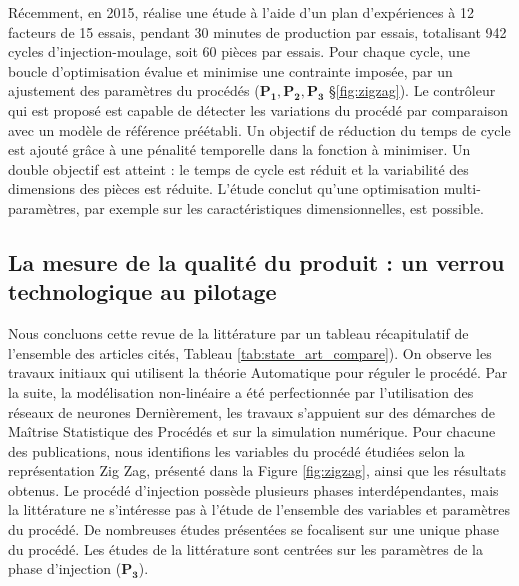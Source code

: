 Récemment, en 2015, \cite{johnston_-line_2015} réalise une étude à l'aide d'un plan d'expériences à 12 facteurs de 15 essais, pendant 30 minutes de production par essais, totalisant 942 cycles d'injection-moulage, soit 60 pièces par essais.
Pour chaque cycle, une boucle d'optimisation évalue et minimise une contrainte imposée, par un ajustement des paramètres du procédés ($\boldsymbol{P_1, P_2, P_3}$ §\ref{fig:zigzag}).
Le contrôleur qui est proposé est capable de détecter les variations du procédé par comparaison avec un modèle de référence préétabli.
Un objectif de réduction du temps de cycle est ajouté grâce à une pénalité temporelle dans la fonction à minimiser.
Un double objectif est atteint : le temps de cycle est réduit et la variabilité des dimensions des pièces est réduite.
L'étude conclut qu’une optimisation  multi-paramètres, par exemple sur les caractéristiques dimensionnelles, est possible.

\subsection{La mesure de la qualité du produit : un verrou technologique au pilotage}
Nous concluons cette revue de la littérature par un tableau récapitulatif de l’ensemble des articles cités, Tableau \ref{tab:state_art_compare}).
On observe les travaux initiaux qui utilisent la théorie Automatique pour réguler le procédé.
Par la suite, la modélisation non-linéaire a été perfectionnée par l'utilisation des réseaux de neurones
Dernièrement, les travaux s'appuient sur des démarches de Maîtrise Statistique des Procédés et sur la simulation numérique.
Pour chacune des publications, nous identifions les variables du procédé étudiées selon la représentation Zig Zag, présenté dans la Figure \ref{fig:zigzag}, ainsi que les résultats obtenus.
Le procédé d’injection possède plusieurs phases interdépendantes, mais la littérature ne s’intéresse pas à l’étude de l’ensemble des variables et paramètres du procédé.
De nombreuses études présentées se focalisent sur une unique phase du procédé.
Les études de la littérature sont centrées sur les paramètres de la phase d’injection ($\boldsymbol{P_3}$).

